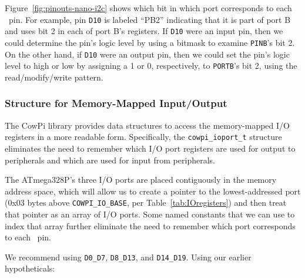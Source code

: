 Figure~\ref{fig:pinouts-nano-i2c} %
shows which bit in which port corresponds to each \mcuboard\ pin.
For example, pin \texttt{D10} is labeled ``PB2'' indicating that it is part of port B and uses bit 2 in each of port B's registers.
If \texttt{D10} were an input pin, then we could determine the pin's logic level by using a bitmask to examine \texttt{PINB}'s bit 2.
On the other hand, if \texttt{D10} were an output pin, then we could set the pin's logic level to high or low by assigning a 1 or 0, respectively, to \texttt{PORTB}'s bit 2, using the read/modify/write pattern.

\subsubsection{Structure for Memory-Mapped Input/Output} \label{subsubsec:mmap_io_struct}

The CowPi library provides data structures to access the memory-mapped I/O registers in a more readable form.
Specifically, the \lstinline{cowpi_ioport_t} structure eliminates the need to remember which I/O port registers are used for output to peripherals and which are used for input from peripherals.



The ATmega328P's three I/O ports are placed contiguously in the memory address space, which will allow us to create a pointer to the lowest-addressed port (0x03 bytes above \lstinline{COWPI_IO_BASE}, per Table~\ref{tab:IOregisters}) and then treat that pointer as an array of I/O ports.
Some named constants that we can use to index that array further eliminate the need to remember which port corresponds to each \mcuboard\ pin.



We recommend using \lstinline{D0_D7}, \lstinline{D8_D13}, and \lstinline{D14_D19}.
Using our earlier hypotheticals:

